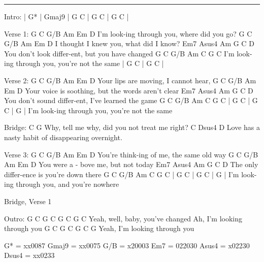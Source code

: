 \noindent\rule{\columnwidth}{1pt}


\begin{lstsong}
Intro: | G* | Gmaj9 | G C | G C | G C |

Verse 1:
G    C    G/B Am          Em              D
 I'm look-ing through you,  where did you go?
G   C       G/B Am       Em           D
  I thought I    knew you,  what did I know?
Em7               Asus4  Am      G   C    D
  You don't look differ-ent, but you have changed
G    C    G/B Am          C                G     C
 I'm look-ing through you, you're not the same
| G C | G C |

Verse 2:
G     C    G/B Am     Em         D
 Your lips are moving,  I cannot hear,
G     C     G/B Am       Em                     D
 Your voice is  soothing,  but the words aren't clear
Em7                Asus4  Am        G       C   D
   You don't sound differ-ent, I've learned the game
G    C    G/B Am           C                G    C   | G C | G C | G  |
 I'm look-ing through you,  you're not the same

Bridge:
C                             G
Why, tell me why, did you not treat me right?
C                         Dsus4        D
Love has a nasty habit of disappearing overnight.

Verse 3:
G       C     G/B Am    Em             D
 You're think-ing of me,  the same old way
G    C    G/B Am      Em          D
 You were a - bove me,  but not today
Em7         Asus4  Am      G      C    D
   The only differ-ence is you're down there
G    C    G/B Am          C             G  C   | G C | G C | G  |
 I'm look-ing through you, and you're nowhere

Bridge, Verse 1

Outro:
G           C            G       C    G     C            G       C
Yeah, well, baby, you've changed       Ah,  I'm looking through you
G    C            G       C     G  C  G
Yeah, I'm looking through you
\end{lstsong}
\vspace{-0.5em}
\begin{multicols}{3}
\begin{lsttab}
G*    = xx0087
Gmaj9 = xx0075
G/B   = x20003
Em7   = 022030
Asus4 = x02230
Dsus4 = xx0233
\end{lsttab}
\end{multicols}
\newpage

\begin{comment}
Chords: 
G*    = xx0087
Gmaj9 = xx0075
G     = 320003
C     = x32013
G/B   = x20003
Am    = x02210
Em    = 022000
D     = xx0232
Em7   = 022030
Asus4 = x02230
Dsus4 = xx0233


Outro:
G           C            G       C
Yeah, well, baby, you've changed
G    C            G       C
 Ah,  I'm looking through you
G    C            G       C     G  C  G
Yeah, I'm looking through you
\end{comment}

